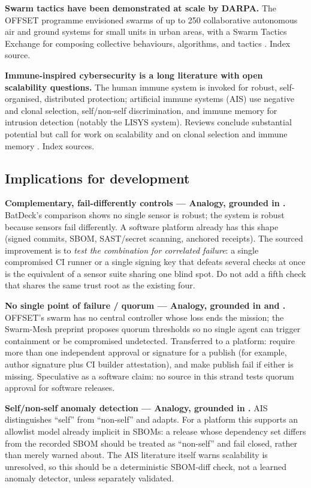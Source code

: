 \documentclass[11pt]{article}
\begin{document}
\textbf{Swarm tactics have been demonstrated at scale by DARPA.}
The OFFSET programme envisioned swarms of up to 250 collaborative
autonomous air and ground systems for small units in urban areas, with
a Swarm Tactics Exchange for composing collective behaviours,
algorithms, and tactics \cite{darpa2020}. Index source.

\textbf{Immune-inspired cybersecurity is a long literature with open
scalability questions.} The human immune system is invoked for robust,
self-organised, distributed protection; artificial immune systems (AIS)
use negative and clonal selection, self/non-self discrimination, and
immune memory for intrusion detection (notably the LISYS system).
Reviews conclude substantial potential but call for work on scalability
and on clonal selection and immune memory \cite{kim2007,bala2025}.
Index sources.

\subsection{Implications for development}
\label{sec:biomimicry-dev}

\textbf{Complementary, fail-differently controls --- Analogy, grounded
in \cite{batdeck2024}.} BatDeck's comparison shows no single sensor is
robust; the system is robust because sensors fail differently. A
software platform already has this shape (signed commits, SBOM,
SAST/secret scanning, anchored receipts). The sourced improvement is to
\emph{test the combination for correlated failure}: a single compromised
CI runner or a single signing key that defeats several checks at once is
the equivalent of a sensor suite sharing one blind spot. Do not add a
fifth check that shares the same trust root as the existing four.

\textbf{No single point of failure / quorum --- Analogy, grounded in
\cite{darpa2020} and \cite{swarmmesh2026}.} OFFSET's swarm has no
central controller whose loss ends the mission; the Swarm-Mesh preprint
proposes quorum thresholds so no single agent can trigger containment or
be compromised undetected. Transferred to a platform: require more than
one independent approval or signature for a publish (for example, author
signature plus CI builder attestation), and make publish fail if either
is missing. Speculative as a software claim: no source in this strand
tests quorum approval for software releases.

\textbf{Self/non-self anomaly detection --- Analogy, grounded in
\cite{kim2007}.} AIS distinguishes ``self'' from ``non-self'' and
adapts. For a platform this supports an allowlist model already implicit
in SBOMs: a release whose dependency set differs from the recorded SBOM
should be treated as ``non-self'' and fail closed, rather than merely
warned about. The AIS literature itself warns scalability is unresolved,
so this should be a deterministic SBOM-diff check, not a learned anomaly
detector, unless separately validated.
\end{document}
